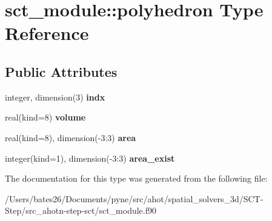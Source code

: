 \hypertarget{structsct__module_1_1polyhedron}{\section{sct\+\_\+module\+:\+:polyhedron Type Reference}
\label{structsct__module_1_1polyhedron}
}
\subsection*{Public Attributes}
\begin{DoxyCompactItemize}
\item 
\hypertarget{structsct__module_1_1polyhedron_a0a9f5f4cc18647a9ebeb2318bc83dfa7}{integer, dimension(3) {\bfseries indx}}\label{structsct__module_1_1polyhedron_a0a9f5f4cc18647a9ebeb2318bc83dfa7}

\item 
\hypertarget{structsct__module_1_1polyhedron_afc1244f7652724346f6ce31ff39214c3}{real(kind=8) {\bfseries volume}}\label{structsct__module_1_1polyhedron_afc1244f7652724346f6ce31ff39214c3}

\item 
\hypertarget{structsct__module_1_1polyhedron_ad7c601a870a982c8a0b30bd2ee3b1427}{real(kind=8), dimension(-\/3\+:3) {\bfseries area}}\label{structsct__module_1_1polyhedron_ad7c601a870a982c8a0b30bd2ee3b1427}

\item 
\hypertarget{structsct__module_1_1polyhedron_a4d8b6322e32640812e3c917645febc0b}{integer(kind=1), dimension(-\/3\+:3) {\bfseries area\+\_\+exist}}\label{structsct__module_1_1polyhedron_a4d8b6322e32640812e3c917645febc0b}

\end{DoxyCompactItemize}


The documentation for this type was generated from the following file\+:\begin{DoxyCompactItemize}
\item 
/\+Users/bates26/\+Documents/pyne/src/ahot/spatial\+\_\+solvers\+\_\+3d/\+S\+C\+T-\/\+Step/src\+\_\+ahotn-\/step-\/sct/sct\+\_\+module.\+f90\end{DoxyCompactItemize}
